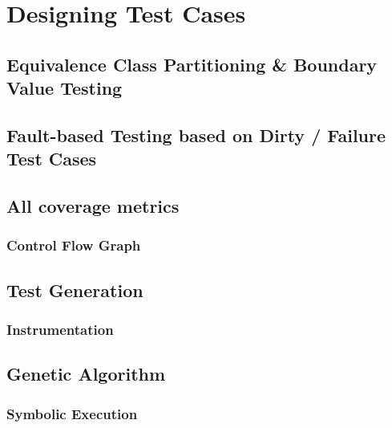 \documentclass[a4paper]{article}
\begin{document}
\section{Designing Test Cases}
\subsection{Equivalence Class Partitioning \& Boundary Value Testing}
\subsection{Fault-based Testing based on Dirty / Failure Test Cases}
\subsection{All coverage metrics}
\subsubsection{Control Flow Graph}
\subsection{Test Generation}
\subsubsection{Instrumentation}
\subsection{Genetic Algorithm}
\subsubsection{Symbolic Execution}
\end{document}
